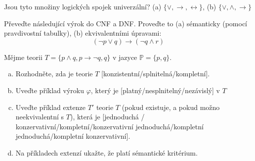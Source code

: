 \begin{problem} 
    
    Jsou tyto množiny logických spojek univerzální? (a) $\{\vee, \rightarrow, \leftrightarrow\}$, (b) $\{\vee, \wedge, \rightarrow\}$    

    \begin{solution}
            
    \end{solution}


\end{problem}


\begin{problem} 
    
    Převeďte následující výrok do CNF a DNF. Proveďte to (a) sémanticky (pomocí pravdivostní tabulky), (b) ekvivalentními úpravami:
    $$
    (\neg p \vee q)\to (\neg q \wedge r)
    $$

    \begin{solution}
            
    \end{solution}
        
\end{problem}


\begin{problem}\label{problem:properties-of-theories}

    Mějme teorii $T=\{p\wedge q,p\to\neg q,q\}$ v jazyce $\mathbb P=\{p,q\}$.
    \begin{enumerate}[(a)]
        \item Rozhodněte, zda je teorie $T$ [konzistentní/splnitelná/kompletní]. %
        \item Uveďte příklad výroku $\varphi$, který je [platný/nesplnitelný/nezávislý] v $T$
        \item Uveďte příklad extenze $T'$ teorie $T$ (pokud existuje, a pokud možno neekvivalentní s $T$), která je [jednoduchá / konzervativní/kompletní/konzervativní jednoduchá/kompletní jednoduchá/kompletní konzervativní].
        \item Na příkladech extenzí ukažte, že platí sémantické kritérium.
    \end{enumerate}

    \begin{solution}
            
    \end{solution}
    
\end{problem}



